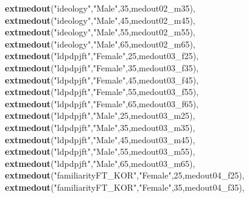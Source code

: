 \documentclass[
]{article}
\newenvironment{Shaded}{\begin{snugshade}}{\end{snugshade}}
\newcommand{\DecValTok}[1]{\textcolor[rgb]{0.00,0.00,0.81}{#1}}
\newcommand{\KeywordTok}[1]{\textcolor[rgb]{0.13,0.29,0.53}{\textbf{#1}}}
\newcommand{\NormalTok}[1]{#1}
\newcommand{\StringTok}[1]{\textcolor[rgb]{0.31,0.60,0.02}{#1}}
\begin{document}
\begin{Shaded}
\begin{Highlighting}[]
                  \KeywordTok{extmedout}\NormalTok{(}\StringTok{"ideology"}\NormalTok{,}\StringTok{"Male"}\NormalTok{,}\DecValTok{35}\NormalTok{,medout02_m35),}
                  \KeywordTok{extmedout}\NormalTok{(}\StringTok{"ideology"}\NormalTok{,}\StringTok{"Male"}\NormalTok{,}\DecValTok{45}\NormalTok{,medout02_m45),}
                  \KeywordTok{extmedout}\NormalTok{(}\StringTok{"ideology"}\NormalTok{,}\StringTok{"Male"}\NormalTok{,}\DecValTok{55}\NormalTok{,medout02_m55),}
                  \KeywordTok{extmedout}\NormalTok{(}\StringTok{"ideology"}\NormalTok{,}\StringTok{"Male"}\NormalTok{,}\DecValTok{65}\NormalTok{,medout02_m65),}
                  \KeywordTok{extmedout}\NormalTok{(}\StringTok{"ldpdpjft"}\NormalTok{,}\StringTok{"Female"}\NormalTok{,}\DecValTok{25}\NormalTok{,medout03_f25),}
                  \KeywordTok{extmedout}\NormalTok{(}\StringTok{"ldpdpjft"}\NormalTok{,}\StringTok{"Female"}\NormalTok{,}\DecValTok{35}\NormalTok{,medout03_f35),}
                  \KeywordTok{extmedout}\NormalTok{(}\StringTok{"ldpdpjft"}\NormalTok{,}\StringTok{"Female"}\NormalTok{,}\DecValTok{45}\NormalTok{,medout03_f45),}
                  \KeywordTok{extmedout}\NormalTok{(}\StringTok{"ldpdpjft"}\NormalTok{,}\StringTok{"Female"}\NormalTok{,}\DecValTok{55}\NormalTok{,medout03_f55),}
                  \KeywordTok{extmedout}\NormalTok{(}\StringTok{"ldpdpjft"}\NormalTok{,}\StringTok{"Female"}\NormalTok{,}\DecValTok{65}\NormalTok{,medout03_f65),}
                  \KeywordTok{extmedout}\NormalTok{(}\StringTok{"ldpdpjft"}\NormalTok{,}\StringTok{"Male"}\NormalTok{,}\DecValTok{25}\NormalTok{,medout03_m25),}
                  \KeywordTok{extmedout}\NormalTok{(}\StringTok{"ldpdpjft"}\NormalTok{,}\StringTok{"Male"}\NormalTok{,}\DecValTok{35}\NormalTok{,medout03_m35),}
                  \KeywordTok{extmedout}\NormalTok{(}\StringTok{"ldpdpjft"}\NormalTok{,}\StringTok{"Male"}\NormalTok{,}\DecValTok{45}\NormalTok{,medout03_m45),}
                  \KeywordTok{extmedout}\NormalTok{(}\StringTok{"ldpdpjft"}\NormalTok{,}\StringTok{"Male"}\NormalTok{,}\DecValTok{55}\NormalTok{,medout03_m55),}
                  \KeywordTok{extmedout}\NormalTok{(}\StringTok{"ldpdpjft"}\NormalTok{,}\StringTok{"Male"}\NormalTok{,}\DecValTok{65}\NormalTok{,medout03_m65),}
                  \KeywordTok{extmedout}\NormalTok{(}\StringTok{"familiarityFT_KOR"}\NormalTok{,}\StringTok{"Female"}\NormalTok{,}\DecValTok{25}\NormalTok{,medout04_f25),}
                  \KeywordTok{extmedout}\NormalTok{(}\StringTok{"familiarityFT_KOR"}\NormalTok{,}\StringTok{"Female"}\NormalTok{,}\DecValTok{35}\NormalTok{,medout04_f35),}

\end{Highlighting}
\end{Shaded}
\end{document}
